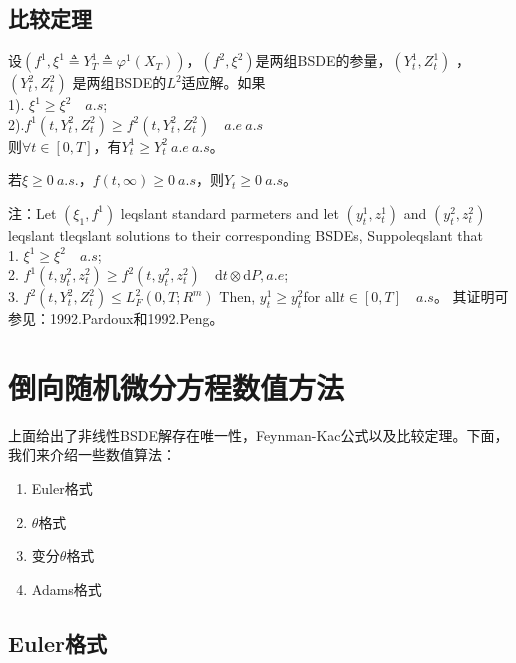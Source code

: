 	\subsection{比较定理}
		\begin{theorem}[比较定理]
			设$(f^{1},{\xi ^{1}} \triangleq Y_T^{1} \triangleq \varphi ^{1}({X_T}) )$，$({f^2},{\xi ^2})$是两组BSDE的参量，$(Y_t^{1},Z_t^{1})$ ，$(Y_t^2,Z_t^2)$ 是两组BSDE的$L^2$适应解。如果\\
			1). $\xi^{1} \geqslant {\xi ^2}\quad a.s$;\\
			2).$f^{1}( {t,Y_t^2,Z_t^2} ) \geqslant {f^2}( {t,Y_t^2,Z_t^2} )\quad a.e\ a.s$\\
			则$\forall t \in [ 0,T]$，有$Y_t^{1} \geqslant Y_t^2\ a.e\ a.s$。
		\end{theorem}
		\begin{corollary}
		若$\xi \geqslant 0\ a.s.$，$f( {t,\infty }) \geqslant 0\ a.s$，则$Y_t \geqslant 0\ a.s$。
		\end{corollary}
		注：Let $(\xi_1,f^1)$ leqslant standard parmeters and let $(y_t^1,z_t^1)$ and $(y_t^2,z_t^2)$ leqslant tleqslant solutions to their corresponding BSDEs, Suppoleqslant that\\
		1. ${\xi ^{1} \geqslant {\xi ^2}} \quad a.s$;\\
		2. ${f^{1}}( {t,y_t^2,z_t^2}) \geqslant {f^2}( t,y_t^2,z_t^2 )\quad \mathrm{d}t \otimes \mathrm{d}P ,a.e$;\\
		3. ${f^2}\left( {t,Y_t^2,Z_t^2} \right) \leqslant L_F^2\left( {0,T;{R^m}} \right)$
		Then, $y_t^{1} \geqslant y_t^2$for all$t \in [ {0,T} ]\quad a.s$。
		其证明可参见：1992.Pardoux\cite{1992.Pardoux}和1992.Peng\cite{1992.Peng}。

\section{倒向随机微分方程数值方法}
	\par
	上面给出了非线性BSDE解存在唯一性，Feynman-Kac公式以及比较定理。下面，我们来介绍一些数值算法：
	\begin{enumerate}
	  \item Euler格式
	  \item $\theta$格式
	  \item 变分$\theta$格式
	  \item Adams格式
	\end{enumerate}

	\subsection{Euler格式}
